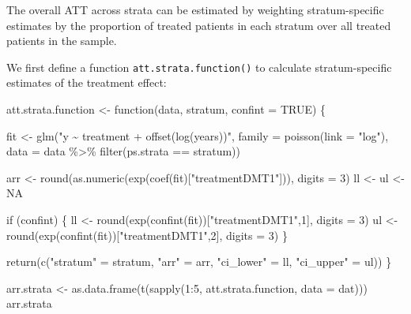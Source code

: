 \documentclass[
  letterpaper,
  DIV=11,
  numbers=noendperiod]{scrreprt}
\newenvironment{Shaded}{\begin{snugshade}}{\end{snugshade}}
\newcommand{\AttributeTok}[1]{\textcolor[rgb]{0.40,0.45,0.13}{#1}}
\newcommand{\ConstantTok}[1]{\textcolor[rgb]{0.56,0.35,0.01}{#1}}
\newcommand{\ControlFlowTok}[1]{\textcolor[rgb]{0.00,0.23,0.31}{#1}}
\newcommand{\DecValTok}[1]{\textcolor[rgb]{0.68,0.00,0.00}{#1}}
\newcommand{\FunctionTok}[1]{\textcolor[rgb]{0.28,0.35,0.67}{#1}}
\newcommand{\NormalTok}[1]{\textcolor[rgb]{0.00,0.23,0.31}{#1}}
\newcommand{\OtherTok}[1]{\textcolor[rgb]{0.00,0.23,0.31}{#1}}
\newcommand{\SpecialCharTok}[1]{\textcolor[rgb]{0.37,0.37,0.37}{#1}}
\newcommand{\StringTok}[1]{\textcolor[rgb]{0.13,0.47,0.30}{#1}}
\begin{document}
The overall ATT across strata can be estimated by weighting
stratum-specific estimates by the proportion of treated patients in each
stratum over all treated patients in the sample.

We first define a function \texttt{att.strata.function()} to calculate
stratum-specific estimates of the treatment effect:

\begin{Shaded}
\begin{Highlighting}[]
\NormalTok{att.strata.function }\OtherTok{\textless{}{-}} \ControlFlowTok{function}\NormalTok{(data, stratum, }\AttributeTok{confint =} \ConstantTok{TRUE}\NormalTok{) \{}

\NormalTok{  fit }\OtherTok{\textless{}{-}} \FunctionTok{glm}\NormalTok{(}\StringTok{"y \textasciitilde{} treatment + offset(log(years))"}\NormalTok{,}
      \AttributeTok{family =} \FunctionTok{poisson}\NormalTok{(}\AttributeTok{link =} \StringTok{"log"}\NormalTok{),}
      \AttributeTok{data =}\NormalTok{ data }\SpecialCharTok{\%\textgreater{}\%} \FunctionTok{filter}\NormalTok{(ps.strata }\SpecialCharTok{==}\NormalTok{ stratum))}

\NormalTok{  arr }\OtherTok{\textless{}{-}} \FunctionTok{round}\NormalTok{(}\FunctionTok{as.numeric}\NormalTok{(}\FunctionTok{exp}\NormalTok{(}\FunctionTok{coef}\NormalTok{(fit)[}\StringTok{"treatmentDMT1"}\NormalTok{])), }\AttributeTok{digits =} \DecValTok{3}\NormalTok{)}
\NormalTok{  ll }\OtherTok{\textless{}{-}}\NormalTok{ ul }\OtherTok{\textless{}{-}} \ConstantTok{NA}
  
  \ControlFlowTok{if}\NormalTok{ (confint) \{}
\NormalTok{    ll }\OtherTok{\textless{}{-}} \FunctionTok{round}\NormalTok{(}\FunctionTok{exp}\NormalTok{(}\FunctionTok{confint}\NormalTok{(fit))[}\StringTok{"treatmentDMT1"}\NormalTok{,}\DecValTok{1}\NormalTok{], }\AttributeTok{digits =} \DecValTok{3}\NormalTok{)}
\NormalTok{    ul }\OtherTok{\textless{}{-}} \FunctionTok{round}\NormalTok{(}\FunctionTok{exp}\NormalTok{(}\FunctionTok{confint}\NormalTok{(fit))[}\StringTok{"treatmentDMT1"}\NormalTok{,}\DecValTok{2}\NormalTok{], }\AttributeTok{digits =} \DecValTok{3}\NormalTok{)}
\NormalTok{  \}}
  
  \FunctionTok{return}\NormalTok{(}\FunctionTok{c}\NormalTok{(}\StringTok{"stratum"} \OtherTok{=}\NormalTok{ stratum,}
           \StringTok{"arr"} \OtherTok{=}\NormalTok{ arr,}
           \StringTok{"ci\_lower"}  \OtherTok{=}\NormalTok{ ll,}
           \StringTok{"ci\_upper"}  \OtherTok{=}\NormalTok{ ul))}
\NormalTok{\}}

\NormalTok{arr.strata }\OtherTok{\textless{}{-}} \FunctionTok{as.data.frame}\NormalTok{(}\FunctionTok{t}\NormalTok{(}\FunctionTok{sapply}\NormalTok{(}\DecValTok{1}\SpecialCharTok{:}\DecValTok{5}\NormalTok{, att.strata.function, }\AttributeTok{data =}\NormalTok{ dat)))}
\NormalTok{arr.strata}
\end{Highlighting}
\end{Shaded}
\end{document}
